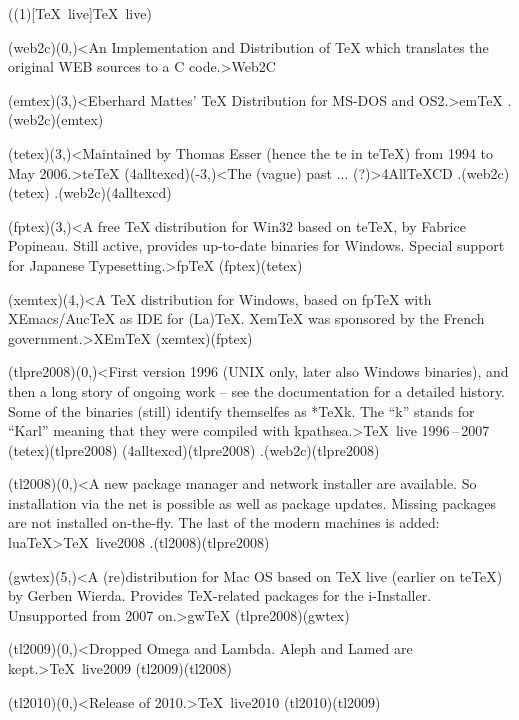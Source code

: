\tograph(\tostruct(1)[\TeX\ live]{\TeX\ live}){
	\tonode(web2c)(0,\layer)<An Implementation and Distribution of TeX which translates the original WEB sources to a C code.>{Web2C}
	\steplayer

	\tonode[\histdistro](emtex)(3,\layer)<Eberhard Mattes' TeX Distribution for MS-DOS and OS2.>{em\TeX}
	\todraw.(web2c)(emtex)
	\steplayer

	\tonode[\histdistro](tetex)(3,\layer)<Maintained by Thomas Esser (hence the te in teTeX) from 1994 to May 2006.>{te\TeX}
	\tonode[\histdistro](4alltexcd)(-3,\layer)<The (vague) past ... (?)>{4All\TeX CD }
	\todraw.(web2c)(tetex)
	\todraw.(web2c)(4alltexcd)
	\steplayer

	\tonode(fptex)(3,\layer)<A free TeX distribution for Win32 based on teTeX, by Fabrice Popineau. Still active, provides up-to-date binaries for Windows. Special support for Japanese Typesetting.>{fp\TeX}
	\todraw(fptex)(tetex)
	\steplayer[-2.5]

	\tonode[\histdistro](xemtex)(4,\layer)<A TeX distribution for Windows, based on fpTeX with XEmacs/AucTeX as IDE for (La)TeX. XemTeX was sponsored by the French government.>{XEm\TeX}
	\todraw(xemtex)(fptex)

	\tonode[\histdistro](tlpre2008)(0,\layer)<First version 1996 (UNIX only, later also Windows binaries), and then a long story of ongoing work – see the documentation for a detailed history. Some of the binaries (still) identify themselfes as *TeXk. The “k” stands for “Karl” meaning that they were compiled with kpathsea.>{\TeX\ live 1996\,–\,2007}
	\todraw(tetex)(tlpre2008)
	\todraw(4alltexcd)(tlpre2008)
	\todraw.(web2c)(tlpre2008)
	\steplayer

	\tonode(tl2008)(0,\layer)<A new package manager and network installer are available. So installation via the net is possible as well as package updates. Missing packages are not installed on-the-fly. The last of the modern machines is added: luaTeX>{\TeX\ live2008}
	\todraw.(tl2008)(tlpre2008)

	\tonode[\histdistro](gwtex)(5,\layer)<A (re)distribution for Mac OS based on TeX live (earlier on teTeX) by Gerben Wierda. Provides TeX-related packages for the i-Installer. Unsupported from 2007 on.>{gw\TeX}
	\todraw(tlpre2008)(gwtex)

	\steplayer

	\tonode(tl2009)(0,\layer)<Dropped Omega and Lambda. Aleph and Lamed are kept.>{\TeX\ live2009}
	\todraw(tl2009)(tl2008)
	\steplayer

	\tonode(tl2010)(0,\layer)<Release of 2010.>{\TeX\ live2010}
	\todraw(tl2010)(tl2009)

}
